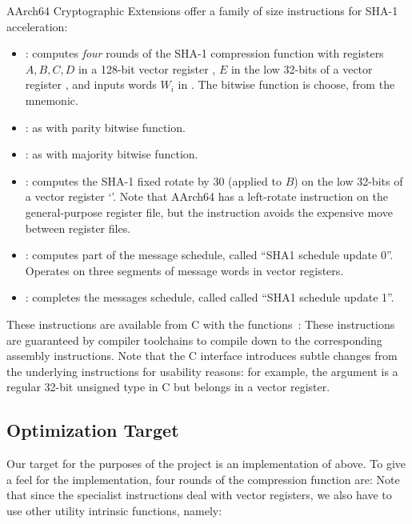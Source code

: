 AArch64 Cryptographic Extensions offer a family of size instructions for SHA-1
acceleration:
%
\begin{itemize}
    \item {}:
        computes \emph{four} rounds of the SHA-1 compression function with
        registers $A,B,C,D$ in a 128-bit vector register , $E$ in the
        low 32-bits of a vector register , and inputs words $W_i$ in
        . The bitwise function is choose, from the  mnemonic.
    \item {}:
        as  with parity bitwise function.
    \item {}:
        as  with majority bitwise function.
    \item {}:
        computes the SHA-1 fixed rotate by 30 (applied to $B$) on the low
        32-bits of a vector register `'. Note that AArch64 has a
        left-rotate instruction on the general-purpose register file, but the
         instruction avoids the expensive move between register
        files.
    \item {}:
        computes part of the message schedule, called ``SHA1 schedule update
        0''. Operates on three segments of message words in vector registers.
    \item {}:
        completes the messages schedule, called called ``SHA1 schedule update
        1''.
\end{itemize}

These instructions are available from C with the 
functions~\cite{arm-neon-sha}:
%
%
These instructions are guaranteed by compiler toolchains to compile down to the
corresponding assembly instructions.  Note that the C interface introduces
subtle changes from the underlying instructions for usability reasons: for
example, the  argument is a regular 32-bit unsigned type in C but
belongs in a vector register.

\subsection{Optimization Target}

Our target for the purposes of the project is an implementation of
 above. To give a feel for the implementation, four rounds of the
compression function are:
%
%
Note that since the specialist instructions deal with vector registers, we also
have to use other utility intrinsic functions, namely:
%

